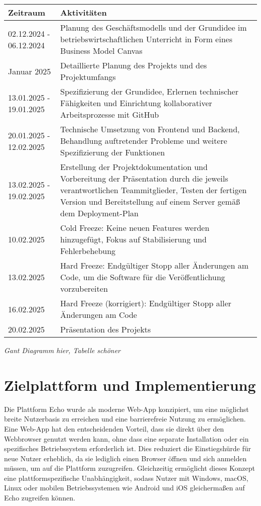 \documentclass[a4paper,12pt]{article}
\begin{document}
\newpage
\begin{longtable}{|p{4cm}|p{11cm}|}
	\hline
	\textbf{Zeitraum} & \textbf{Aktivitäten} \\
	\hline
	02.12.2024 - 06.12.2024 & Planung des Geschäftsmodells und der Grundidee im betriebswirtschaftlichen Unterricht in Form eines Business Model Canvas \\
	\hline
	Januar 2025 & Detaillierte Planung des Projekts und des Projektumfangs \\
	\hline
	13.01.2025 - 19.01.2025 & Spezifizierung der Grundidee, Erlernen technischer Fähigkeiten und Einrichtung kollaborativer Arbeitsprozesse mit GitHub \\
	\hline
	20.01.2025 - 12.02.2025 & Technische Umsetzung von Frontend und Backend, Behandlung auftretender Probleme und weitere Spezifizierung der Funktionen \\
	\hline
	13.02.2025 - 19.02.2025 & Erstellung der Projektdokumentation und Vorbereitung der Präsentation durch die jeweils verantwortlichen Teammitglieder, Testen der fertigen Version und Bereitstellung auf einem Server gemäß dem Deployment-Plan \\
	\hline
	10.02.2025 & Cold Freeze: Keine neuen Features werden hinzugefügt, Fokus auf Stabilisierung und Fehlerbehebung \\
	\hline
	13.02.2025 & Hard Freeze: Endgültiger Stopp aller Änderungen am Code, um die Software für die Veröffentlichung vorzubereiten \\
	\hline
	16.02.2025 & Hard Freeze (korrigiert): Endgültiger Stopp aller Änderungen am Code \\
	\hline
	20.02.2025 & Präsentation des Projekts \\
	\hline
\end{longtable}

\textit{
Gant Diagramm hier, Tabelle schöner
}

\newpage
\section{Zielplattform und Implementierung}
Die Plattform Echo wurde als moderne Web-App konzipiert, um eine möglichst
breite Nutzerbasis zu erreichen und eine barrierefreie Nutzung zu ermöglichen.
Eine Web-App hat den entscheidenden Vorteil, dass sie direkt über den
Webbrowser genutzt werden kann, ohne dass eine separate Installation oder ein
spezifisches Betriebssystem erforderlich ist. Dies reduziert die Einstiegshürde
für neue Nutzer erheblich, da sie lediglich einen Browser öffnen und sich
anmelden müssen, um auf die Plattform zuzugreifen. Gleichzeitig ermöglicht
dieses Konzept eine plattformspezifische Unabhängigkeit, sodass Nutzer mit
Windows, macOS, Linux oder mobilen Betriebssystemen wie Android und iOS
gleichermaßen auf Echo zugreifen können.
\end{document}
